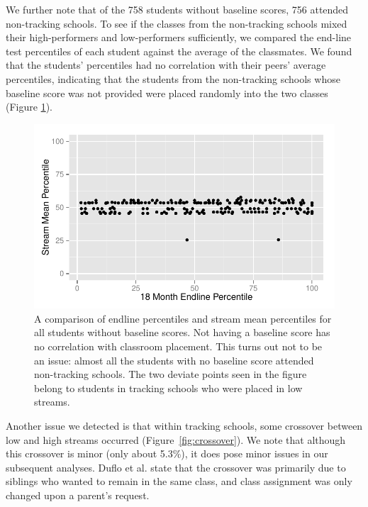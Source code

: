 \documentclass[11pt]{article}
\begin{document}
We further note that of the 758 students without baseline scores, 756 attended non-tracking schools.  To see if the classes from the non-tracking schools mixed their high-performers and low-performers sufficiently, we compared the end-line test percentiles of each student against the average of the classmates. We found that the students' percentiles had no correlation with their peers' average percentiles, indicating that the students from the non-tracking schools whose baseline score was not provided were placed randomly into the two classes (Figure \ref{fig:NoBaselinePercentile}).

  \begin{figure}[H]
  	\centering
  	\includegraphics[scale=0.8]{../Figures/NoBaselinePercentile.pdf}
  	\caption{A comparison of endline percentiles and stream mean percentiles for all students without baseline scores.  Not having a baseline score has no correlation with classroom placement.  This turns out not to be an issue: almost all the students with no baseline score attended non-tracking schools.  The two deviate points seen in the figure belong to students in tracking schools who were placed in low streams.}
  	\label{fig:NoBaselinePercentile}
  \end{figure} 

Another issue we detected is that within tracking schools, some crossover between low and high streams occurred (Figure~\ref{fig:crossover}). We note that although this crossover is minor (only about 5.3\%), it does pose minor issues in our subsequent analyses. Duflo et al. state that the crossover was primarily due to siblings who wanted to remain in the same class, and class assignment was only changed upon a parent's request.

 
 
\end{document}

